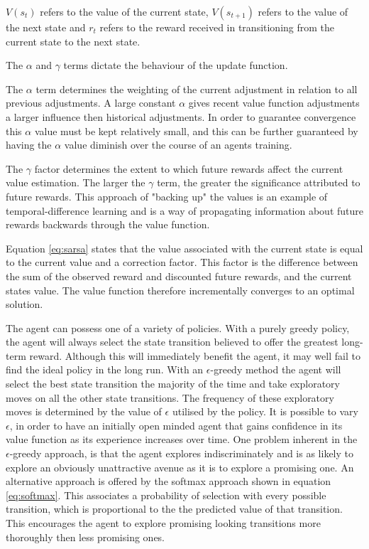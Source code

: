 \documentclass{rucsthesis}
\begin{document}
$V(s_t)$ refers to the value of the current state, $V(s_{t+1})$ refers to the value of the next state and $r_t$ refers to the reward received in transitioning from the current state to the next state. 

The $\alpha$ and $\gamma$ terms dictate the behaviour of the update function. 

The $\alpha$ term determines the weighting of the current adjustment in relation to all previous adjustments. A large constant $\alpha$ gives recent value function adjustments a larger influence then historical adjustments. In order to guarantee convergence this $\alpha$ value must be kept relatively small, and this can be further guaranteed by having the $\alpha$ value diminish over the course of an agents training. 

The $\gamma$ factor determines the extent to which future rewards affect the current value estimation. The larger the $\gamma$ term, the greater the significance attributed to future rewards. This approach of "backing up" the values is an example of temporal-difference learning\citep{suttonbarto} and is a way of propagating information about future rewards backwards through the value function.

Equation \ref{eq:sarsa} states that the value associated with the current state is equal to the current value and a correction factor. This factor is the difference between the sum of the observed reward and discounted future rewards, and the current states value. The value function therefore incrementally converges to an optimal solution.

The agent can possess one of a variety of policies. With a purely greedy policy, the agent will always select the state transition believed to offer the greatest long-term reward. Although this will immediately benefit the agent, it may well fail to find the ideal policy in the long run. With an $\epsilon$-greedy method the agent will select the best state transition the majority of the time and take exploratory moves on all the other state transitions. The frequency of these exploratory moves is determined by the value of $\epsilon$ utilised by the policy. It is possible to vary $\epsilon$, in order to have an initially open minded agent that gains confidence in its value function as its experience increases over time. One problem inherent in the $\epsilon$-greedy approach, is that the agent explores indiscriminately and is as likely to explore an obviously unattractive avenue as it is to explore a promising one. An alternative approach is offered by the softmax approach shown in equation \ref{eq:softmax}. This associates a probability of selection with every possible transition, which is proportional to the the predicted value of that transition. This encourages the agent to explore promising looking transitions more thoroughly then less promising ones.
\end{document}
